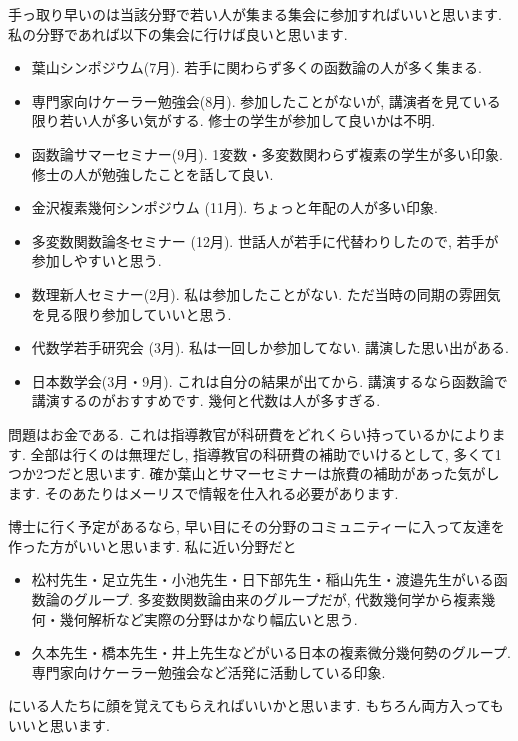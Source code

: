 手っ取り早いのは当該分野で若い人が集まる集会に参加すればいいと思います. 
私の分野であれば以下の集会に行けば良いと思います. 
\begin{itemize}[left=0pt]
  \setlength{\parskip}{0cm} %
  \setlength{\itemsep}{0cm} %
\item 葉山シンポジウム(7月). 若手に関わらず多くの函数論の人が多く集まる.
\item 専門家向けケーラー勉強会(8月). 参加したことがないが, 講演者を見ている限り若い人が多い気がする. 修士の学生が参加して良いかは不明. 
\item 函数論サマーセミナー(9月). 1変数・多変数関わらず複素の学生が多い印象. 修士の人が勉強したことを話して良い.
\item 金沢複素幾何シンポジウム (11月). ちょっと年配の人が多い印象. 
\item 多変数関数論冬セミナー (12月). 世話人が若手に代替わりしたので, 若手が参加しやすいと思う.
\item 数理新人セミナー(2月). 私は参加したことがない. ただ当時の同期の雰囲気を見る限り参加していいと思う. 
\item 代数学若手研究会 (3月). 私は一回しか参加してない. 講演した思い出がある. 
\item 日本数学会(3月・9月). これは自分の結果が出てから. 講演するなら函数論で講演するのがおすすめです. 幾何と代数は人が多すぎる.  
\end{itemize}
問題はお金である. これは指導教官が科研費をどれくらい持っているかによります. 
全部は行くのは無理だし, 指導教官の科研費の補助でいけるとして, 多くて1つか2つだと思います. 
確か葉山とサマーセミナーは旅費の補助があった気がします.
そのあたりはメーリスで情報を仕入れる必要があります. 

博士に行く予定があるなら, 早い目にその分野のコミュニティーに入って友達を作った方がいいと思います. 
私に近い分野だと
\begin{itemize}
  \setlength{\parskip}{0cm} %
  \setlength{\itemsep}{0cm} %
\item 松村先生・足立先生・小池先生・日下部先生・稲山先生・渡邉先生がいる函数論のグループ. 多変数関数論由来のグループだが, 代数幾何学から複素幾何・幾何解析など実際の分野はかなり幅広いと思う. 
\item 久本先生・橋本先生・井上先生などがいる日本の複素微分幾何勢のグループ. 専門家向けケーラー勉強会など活発に活動している印象. 
\end{itemize}
にいる人たちに顔を覚えてもらえればいいかと思います.
もちろん両方入ってもいいと思います. 
\vspace{8pt} 

